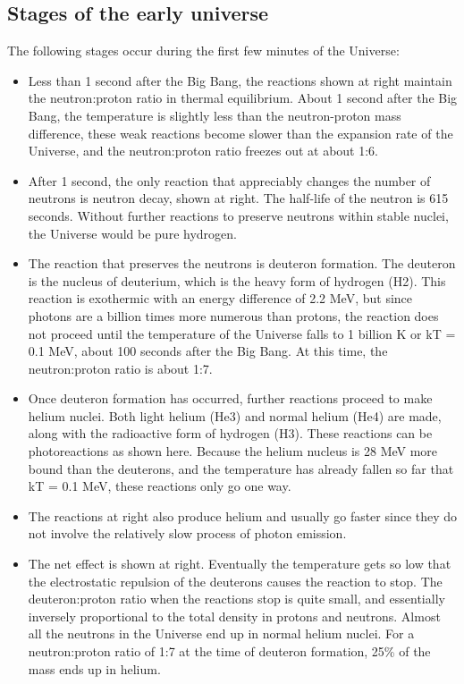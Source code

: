\documentclass[12pt, a4paper]{article}
\begin{document}
\subsection{Stages of the early universe}
The following stages occur during the first few minutes of the Universe:
\begin{itemize}
\item Less than 1 second after the Big Bang, the reactions shown at right maintain the neutron:proton ratio in thermal equilibrium. About 1 second after the Big Bang, the temperature is slightly less than the neutron-proton mass difference, these weak reactions become slower than the expansion rate of the Universe, and the neutron:proton ratio freezes out at about 1:6.
\item After 1 second, the only reaction that appreciably changes the number of neutrons is neutron decay, shown at right. The half-life of the neutron is 615 seconds. Without further reactions to preserve neutrons within stable nuclei, the Universe would be pure hydrogen.
\item The reaction that preserves the neutrons is deuteron formation. The deuteron is the nucleus of deuterium, which is the heavy form of hydrogen (H2). This reaction is exothermic with an energy difference of 2.2 MeV, but since photons are a billion times more numerous than protons, the reaction does not proceed until the temperature of the Universe falls to 1 billion K or kT = 0.1 MeV, about 100 seconds after the Big Bang. At this time, the neutron:proton ratio is about 1:7.
\item Once deuteron formation has occurred, further reactions proceed to make helium nuclei. Both light helium (He3) and normal helium (He4) are made, along with the radioactive form of hydrogen (H3). These reactions can be photoreactions as shown here. Because the helium nucleus is 28 MeV more bound than the deuterons, and the temperature has already fallen so far that kT = 0.1 MeV, these reactions only go one way.
\item The reactions at right also produce helium and usually go faster since they do not involve the relatively slow process of photon emission.
\item The net effect is shown at right. Eventually the temperature gets so low that the electrostatic repulsion of the deuterons causes the reaction to stop. The deuteron:proton ratio when the reactions stop is quite small, and essentially inversely proportional to the total density in protons and neutrons. Almost all the neutrons in the Universe end up in normal helium nuclei. For a neutron:proton ratio of 1:7 at the time of deuteron formation, 25\% of the mass ends up in helium.
\end{itemize}
\end{document}
